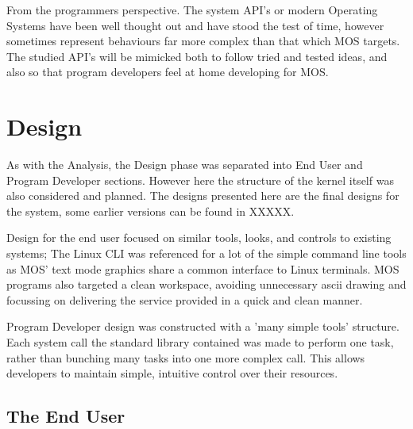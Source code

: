 \documentclass[a4paper]{report}
\begin{document}
From the programmers perspective. The system API's or modern Operating Systems have been well thought out and have stood the test of time, however sometimes represent behaviours far more complex than that which MOS targets. The studied API's will be mimicked both to follow tried and tested ideas, and also so that program developers feel at home developing for MOS.

































\clearpage
\chapter{Design}

As with the Analysis, the Design phase was separated into End User and Program Developer sections. However here the structure of the kernel itself was also considered and planned. The designs presented here are the final designs for the system, some earlier versions can be found in XXXXX.

Design for the end user focused on similar tools, looks, and controls to existing systems; The Linux CLI was referenced for a lot of the simple command line tools as MOS' text mode graphics share a common interface to Linux terminals. MOS programs also targeted a clean workspace, avoiding unnecessary ascii drawing and focussing on delivering the service provided in a quick and clean manner.

Program Developer design was constructed with a 'many simple tools' structure. Each system call the standard library contained was made to perform one task, rather than bunching many tasks into one more complex call. This allows developers to maintain simple, intuitive control over their resources.

\clearpage
\section{The End User}
\end{document}
